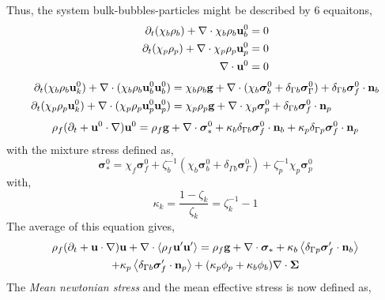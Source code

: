 \documentclass[12pt]{My_preprint}
\begin{document}
Thus, the system bulk-bubbles-particles might be described by 6 equaitons, 
\begin{align}
    \partial_t (\chi_b \rho_b)
    + \mathbf{\nabla}\cdot 
        \chi_b \rho_b \textbf{u}_b^0
    &= 
    0\\
    \partial_t (\chi_p \rho_p)
    + \mathbf{\nabla}\cdot 
        \chi_p \rho_p \textbf{u}_p^0
    &= 
    0\\
    \mathbf{\nabla}\cdot \textbf{u}^0
    &= 
    0
\end{align}
\begin{align}
    \partial_t (\chi_b \rho_b \textbf{u}^0_k)
    + \mathbf{\nabla}\cdot (
        \chi_b \rho_b \textbf{u}^0_b \textbf{u}_b^0
        )
    &= 
    \chi_b \rho_b \textbf{g}
    + \mathbf{\nabla}\cdot (\chi_b \bm\sigma_b^0  + \delta_{\Gamma b} \bm\sigma_\Gamma^0 )
    + \delta_{\Gamma b}  \bm\sigma_f^0 \cdot \textbf{n}_b\\
    \partial_t (\chi_p \rho_p \textbf{u}^0_k)
    + \mathbf{\nabla}\cdot (
        \chi_p \rho_p \textbf{u}^0_p \textbf{u}_p^0
        )
    &= 
    \chi_p \rho_p \textbf{g}
    + \mathbf{\nabla}\cdot \chi_p \bm\sigma_p^0  
    + \delta_{\Gamma b}  \bm\sigma_f^0 \cdot \textbf{n}_p
\end{align}
\begin{equation}
    \rho_f (\partial_t + \textbf{u}^0 \cdot \mathbf{\nabla})\textbf{u}^0
    = 
    \rho_f \textbf{g}
    + \mathbf{\nabla}\cdot \bm\sigma^0_*
    +\kappa_b  \delta_{\Gamma b}  \bm\sigma_f^0 \cdot \textbf{n}_b 
    +\kappa_p  \delta_{\Gamma p}  \bm\sigma_f^0 \cdot \textbf{n}_p 
\end{equation}
with the mixture stress defined as, 
\begin{equation}
    \bm\sigma^0_*
    =
    \chi_f \bm\sigma_f^0  
    +\zeta_b^{-1} (\chi_b \bm\sigma_b^0 + \delta_{\Gamma b} \bm\sigma_\Gamma^0)  
    +\zeta_p^{-1} \chi_p \bm\sigma_p^0 
\end{equation}
with, 
\begin{equation}
    \kappa_k 
    = \frac{1  - \zeta_k}{\zeta_k}
    = \zeta^{-1}_k - 1
\end{equation}
The average of this equation gives, 
\begin{multline}
    \rho_f (\partial_t + \textbf{u} \cdot \mathbf{\nabla})\textbf{u}
    + \mathbf{\nabla}\cdot \left<\rho_f \textbf{u}' \textbf{u}'\right>
    = 
    \rho_f \textbf{g}
    + \mathbf{\nabla}\cdot \bm\sigma_*
    +\kappa_b  \left<\delta_{\Gamma p} \bm\sigma_f' \cdot \textbf{n}_b\right> \\
    +\kappa_p  \left<\delta_{\Gamma b}  \bm\sigma_f' \cdot \textbf{n}_p\right> 
    + (\kappa_p \phi_p + \kappa_b \phi_b)\mathbf{\nabla}\cdot\bm\Sigma
\end{multline}
The \textit{Mean newtonian stress} and the mean effective stress is now defined as, 
\end{document}
